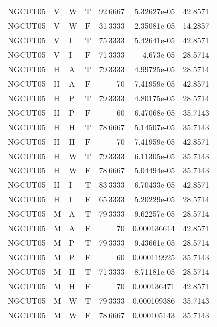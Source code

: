 \begin{longtable}{llllrrr}
    NGCUT05  & V     & W     & T          & 92.6667    & 5.32627e-05 & 42.8571  \\
    NGCUT05  & V     & W     & F          & 31.3333    & 2.35081e-05 & 14.2857  \\
    NGCUT05  & V     & I     & T          & 75.3333    & 5.42641e-05 & 42.8571  \\
    NGCUT05  & V     & I     & F          & 71.3333    & 4.673e-05   & 28.5714  \\
    NGCUT05  & H     & A     & T          & 79.3333    & 4.99725e-05 & 28.5714  \\
    NGCUT05  & H     & A     & F          & 70         & 7.41959e-05 & 42.8571  \\
    NGCUT05  & H     & P     & T          & 79.3333    & 4.80175e-05 & 28.5714  \\
    NGCUT05  & H     & P     & F          & 60         & 6.47068e-05 & 35.7143  \\
    NGCUT05  & H     & H     & T          & 78.6667    & 5.14507e-05 & 35.7143  \\
    NGCUT05  & H     & H     & F          & 70         & 7.41959e-05 & 42.8571  \\
    NGCUT05  & H     & W     & T          & 79.3333    & 6.11305e-05 & 35.7143  \\
    NGCUT05  & H     & W     & F          & 78.6667    & 5.04494e-05 & 35.7143  \\
    NGCUT05  & H     & I     & T          & 83.3333    & 6.70433e-05 & 42.8571  \\
    NGCUT05  & H     & I     & F          & 65.3333    & 5.20229e-05 & 28.5714  \\
    NGCUT05  & M     & A     & T          & 79.3333    & 9.62257e-05 & 28.5714  \\
    NGCUT05  & M     & A     & F          & 70         & 0.000136614 & 42.8571  \\
    NGCUT05  & M     & P     & T          & 79.3333    & 9.43661e-05 & 28.5714  \\
    NGCUT05  & M     & P     & F          & 60         & 0.000119925 & 35.7143  \\
    NGCUT05  & M     & H     & T          & 71.3333    & 8.71181e-05 & 28.5714  \\
    NGCUT05  & M     & H     & F          & 70         & 0.000136471 & 42.8571  \\
    NGCUT05  & M     & W     & T          & 79.3333    & 0.000109386 & 35.7143  \\
    NGCUT05  & M     & W     & F          & 78.6667    & 0.000105143 & 35.7143  \\

\end{longtable}
